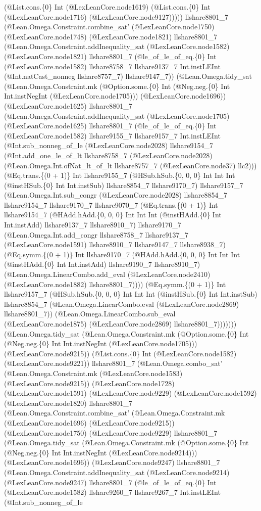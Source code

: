 \documentclass[11pt]{article}
\begin{document}
(@List.cons.\{0\} Int (@LexLeanCore.node1619) (@List.cons.\{0\} Int (@LexLeanCore.node1716) (@LexLeanCore.node9127))))) llshare8801\_7 (@Lean.Omega.Constraint.combine\_sat' (@LexLeanCore.node1750) (@LexLeanCore.node1748) (@LexLeanCore.node1821) llshare8801\_7 (@Lean.Omega.Constraint.addInequality\_sat (@LexLeanCore.node1582) (@LexLeanCore.node1821) llshare8801\_7 (@le\_of\_le\_of\_eq.\{0\} Int (@LexLeanCore.node1582) llshare8758\_7 llshare9137\_7 Int.instLEInt (@Int.natCast\_nonneg llshare8757\_7) llshare9147\_7)) (@Lean.Omega.tidy\_sat (@Lean.Omega.Constraint.mk (@Option.some.\{0\} Int (@Neg.neg.\{0\} Int Int.instNegInt (@LexLeanCore.node1705))) (@LexLeanCore.node1696)) (@LexLeanCore.node1625) llshare8801\_7 (@Lean.Omega.Constraint.addInequality\_sat (@LexLeanCore.node1705) (@LexLeanCore.node1625) llshare8801\_7 (@le\_of\_le\_of\_eq.\{0\} Int (@LexLeanCore.node1582) llshare9155\_7 llshare9157\_7 Int.instLEInt (@Int.sub\_nonneg\_of\_le (@LexLeanCore.node2028) llshare9154\_7 (@Int.add\_one\_le\_of\_lt llshare8758\_7 (@LexLeanCore.node2028) (@Lean.Omega.Int.ofNat\_lt\_of\_lt llshare8757\_7 (@LexLeanCore.node37) llc2))) (@Eq.trans.\{(0 + 1)\} Int llshare9155\_7 (@HSub.hSub.\{0, 0, 0\} Int Int Int (@instHSub.\{0\} Int Int.instSub) llshare8854\_7 llshare9170\_7) llshare9157\_7 (@Lean.Omega.Int.sub\_congr (@LexLeanCore.node2028) llshare8854\_7 llshare9154\_7 llshare9170\_7 llshare9070\_7 (@Eq.trans.\{(0 + 1)\} Int llshare9154\_7 (@HAdd.hAdd.\{0, 0, 0\} Int Int Int (@instHAdd.\{0\} Int Int.instAdd) llshare9137\_7 llshare8910\_7) llshare9170\_7 (@Lean.Omega.Int.add\_congr llshare8758\_7 llshare9137\_7 (@LexLeanCore.node1591) llshare8910\_7 llshare9147\_7 llshare8938\_7) (@Eq.symm.\{(0 + 1)\} Int llshare9170\_7 (@HAdd.hAdd.\{0, 0, 0\} Int Int Int (@instHAdd.\{0\} Int Int.instAdd) llshare9190\_7 llshare8910\_7) (@Lean.Omega.LinearCombo.add\_eval (@LexLeanCore.node2410) (@LexLeanCore.node1882) llshare8801\_7)))) (@Eq.symm.\{(0 + 1)\} Int llshare9157\_7 (@HSub.hSub.\{0, 0, 0\} Int Int Int (@instHSub.\{0\} Int Int.instSub) llshare8854\_7 (@Lean.Omega.LinearCombo.eval (@LexLeanCore.node2869) llshare8801\_7)) (@Lean.Omega.LinearCombo.sub\_eval (@LexLeanCore.node1875) (@LexLeanCore.node2869) llshare8801\_7))))))) (@Lean.Omega.tidy\_sat (@Lean.Omega.Constraint.mk (@Option.some.\{0\} Int (@Neg.neg.\{0\} Int Int.instNegInt (@LexLeanCore.node1705))) (@LexLeanCore.node9215)) (@List.cons.\{0\} Int (@LexLeanCore.node1582) (@LexLeanCore.node9221)) llshare8801\_7 (@Lean.Omega.combo\_sat' (@Lean.Omega.Constraint.mk (@LexLeanCore.node1583) (@LexLeanCore.node9215)) (@LexLeanCore.node1728) (@LexLeanCore.node1591) (@LexLeanCore.node9229) (@LexLeanCore.node1592) (@LexLeanCore.node1820) llshare8801\_7 (@Lean.Omega.Constraint.combine\_sat' (@Lean.Omega.Constraint.mk (@LexLeanCore.node1696) (@LexLeanCore.node9215)) (@LexLeanCore.node1750) (@LexLeanCore.node9229) llshare8801\_7 (@Lean.Omega.tidy\_sat (@Lean.Omega.Constraint.mk (@Option.some.\{0\} Int (@Neg.neg.\{0\} Int Int.instNegInt (@LexLeanCore.node9214))) (@LexLeanCore.node1696)) (@LexLeanCore.node9247) llshare8801\_7 (@Lean.Omega.Constraint.addInequality\_sat (@LexLeanCore.node9214) (@LexLeanCore.node9247) llshare8801\_7 (@le\_of\_le\_of\_eq.\{0\} Int (@LexLeanCore.node1582) llshare9260\_7 llshare9267\_7 Int.instLEInt (@Int.sub\_nonneg\_of\_le 
\end{document}
